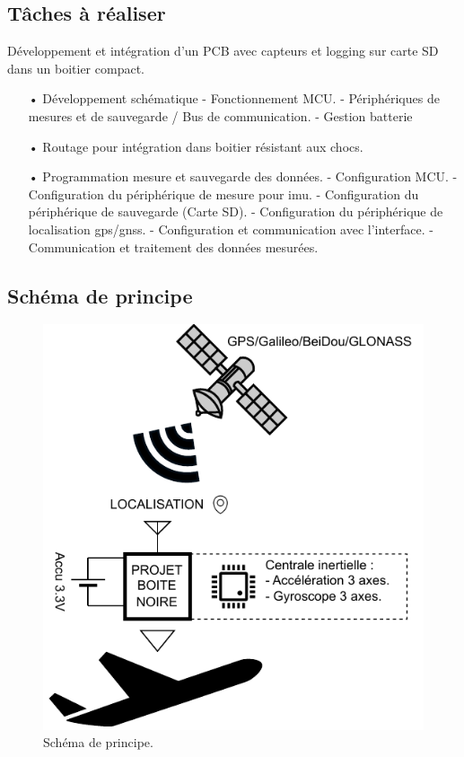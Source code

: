 \subsection{Tâches à réaliser}
Développement et intégration d’un PCB avec capteurs et logging sur carte SD dans un boitier compact.
\begin{itemize}
	\item[•] Développement schématique 
	\subitem- Fonctionnement MCU.
	\subitem-	Périphériques de mesures et de sauvegarde / Bus de communication.
	\subitem-	Gestion batterie 
	\item[•]	Routage pour intégration dans boitier résistant aux chocs.
	\item[•]	Programmation mesure et sauvegarde des données.
	\subitem-	Configuration MCU.
	\subitem-	Configuration du périphérique de mesure pour \gls{imu}.
	\subitem-	Configuration du périphérique de sauvegarde (Carte SD).
	\subitem-	Configuration du périphérique de localisation \gls{gps}/\gls{gnss}.
	\subitem-	Configuration et communication avec l'interface.
	\subitem-	Communication et traitement des données mesurées.
\end{itemize}

\subsection{Schéma de principe}
\begin{figure}[h]
	\centering
	\includegraphics[width=0.6\linewidth]{../figures/cdc/schema_principe}
	\caption{Schéma de principe.}
	\label{fig:schemaprincipe}
\end{figure}

